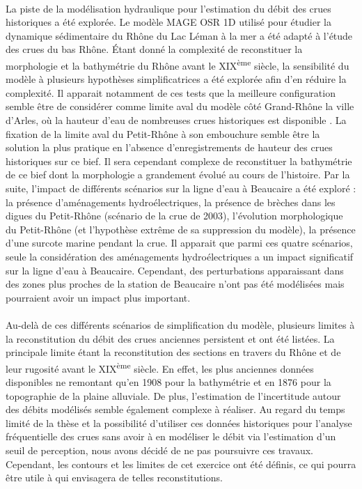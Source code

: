 \documentclass[11pt]{article}
\begin{document}
	\paragraph{} La piste de la modélisation hydraulique pour l'estimation du débit des crues historiques a été explorée. Le modèle MAGE OSR 1D utilisé pour étudier la dynamique sédimentaire du Rhône du Lac Léman à la mer a été adapté à l'étude des crues du bas Rhône. Étant donné la complexité de reconstituer la morphologie et la bathymétrie du Rhône avant le XIX\textsuperscript{ème} siècle, la sensibilité du modèle à plusieurs hypothèses simplificatrices a été explorée afin d'en réduire la complexité. Il apparait notamment de ces tests que la meilleure configuration semble être de considérer comme limite aval du modèle côté Grand-Rhône la ville d'Arles, où la hauteur d'eau de nombreuses crues historiques est disponible \citep{pichard_hauteurs_2013}. La fixation de la limite aval du Petit-Rhône à son embouchure semble être la solution la plus pratique en l'absence d'enregistrements de hauteur des crues historiques sur ce bief. Il sera cependant complexe de reconstituer la bathymétrie de ce bief dont la morphologie a grandement évolué au cours de l'histoire. Par la suite, l'impact de différents scénarios sur la ligne d'eau à Beaucaire a été exploré : la présence d'aménagements hydroélectriques, la présence de brèches dans les digues du Petit-Rhône (scénario de la crue de 2003), l'évolution morphologique du Petit-Rhône (et l'hypothèse extrême de sa suppression du modèle), la présence d'une surcote marine pendant la crue. Il apparait que parmi ces quatre scénarios, seule la considération des aménagements hydroélectriques a un impact significatif sur la ligne d'eau à Beaucaire. Cependant, des perturbations apparaissant dans des zones plus proches de la station de Beaucaire n'ont pas été modélisées mais pourraient avoir un impact plus important.
	
	\paragraph{}	 Au-delà de ces différents scénarios de simplification du modèle, plusieurs limites à la reconstitution du débit des crues anciennes persistent et ont été listées. La principale limite étant la reconstitution des sections en travers du Rhône et de leur rugosité avant le XIX\textsuperscript{ème} siècle. En effet, les plus anciennes données disponibles ne remontant qu'en 1908 pour la bathymétrie et en 1876 pour la topographie de la plaine alluviale. De plus, l'estimation de l'incertitude autour des débits modélisés semble également complexe à réaliser. Au regard du temps limité de la thèse et la possibilité d'utiliser ces données historiques pour l'analyse fréquentielle des crues sans avoir à en modéliser le débit via l'estimation d'un seuil de perception, nous avons décidé de ne pas poursuivre ces travaux. Cependant, les contours et les limites de cet exercice ont été définis, ce qui pourra être utile à qui envisagera de telles reconstitutions. 
	
\end{document}
